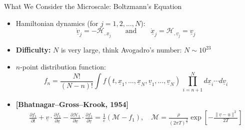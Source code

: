 \documentclass[final,hyperref={pdfpagelabels=false}]{beamer}
\newcommand{\bunderline}[1]{\underline{#1}}
\renewcommand{\vec}[1]{{\bunderline{#1}}}
\begin{document}
\begin{frame}[t]
\begin{columns}[t]
\begin{column}{.31\textwidth}
\begin{block}{What We Consider the Microscale: Boltzmann's Equation}
\begin{itemize}

\item Hamiltonian dynamics (for $j=1,2,\ldots,N$):
\[
	\dot{\vec{v}}_j = - {\mathcal H}_{,\vec{x}_j} \qquad \text{and} \qquad
	\dot{\vec{x}}_j =  {\mathcal H}_{,\vec{v}_j}
	= \vec{v}_j
\]


\item {\bf Difficulty:} $N$ is very large, think Avogadro's number: 
$N \sim 10^{23}$

\item $n$-point distribution function:
\[
f_n = 
\frac{N!}{(N-n)!}
\int f\left(t,\vec{x}_1,\ldots,\vec{x}_N,\vec{v}_1,\ldots,\vec{v}_N \right) \,
	\prod_{i=n+1}^N d\vec{x}_i \cdots d\vec{v}_i
\]


\item  {\bf [Bhatnagar--Gross--Krook, 1954]}
\begin{gather*}
\frac{\partial f_1}{\partial t} +
	\vec{v} \cdot \frac{\partial f_1}{\partial \vec{x}}
	- \frac{\partial {\mathcal H}_1}{\partial \vec{x}}
	 \cdot \frac{\partial f_1}{\partial \vec{v}} =
	 \frac{1}{\varepsilon} \left( {\mathcal M} - f_1 \right), \quad
	 {\mathcal M} = \frac{\rho}{\left(2 \pi T \right)^{\frac{3}{2}}}
	\exp\left[- \frac{ \| \vec{v} - \vec{u} \|^2}{2T} \right]
\end{gather*}

\end{itemize}

\end{block}

\end{column} %


\end{columns}
\end{frame}
\end{document}

